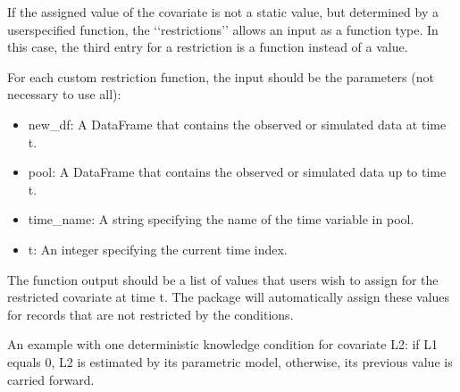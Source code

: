 \documentclass[letterpaper,10pt,english]{sphinxmanual}
\begin{document}
\sphinxAtStartPar
If the assigned value of the covariate is not a static value, but determined by a user\sphinxhyphen{}specified function,
the ‘‘restrictions’’ allows an input as a function type. In this case, the third entry for a restriction is a function
instead of a value.

\sphinxAtStartPar
For each custom restriction function, the input should be the parameters (not necessary to use all):
\begin{itemize}
\item {} 
\sphinxAtStartPar
new\_df: A DataFrame that contains the observed or simulated data at time t.

\item {} 
\sphinxAtStartPar
pool: A DataFrame that contains the observed or simulated data up to time t.

\item {} 
\sphinxAtStartPar
time\_name: A string specifying the name of the time variable in pool.

\item {} 
\sphinxAtStartPar
t: An integer specifying the current time index.

\end{itemize}

\sphinxAtStartPar
The function output should be a list of values that users wish to assign for the restricted covariate at time t.
The package will automatically assign these values for records that are not restricted by the conditions.

\sphinxAtStartPar
An example with one deterministic knowledge condition for covariate L2: if L1 equals 0, L2 is estimated
by its parametric model, otherwise, its previous value is carried forward.

\begin{sphinxVerbatim}[commandchars=\\\{\}]
    
      \PYG{p}{[}\PYG{p}{[}\PYG{p}{]}   \PYG{p}{]}
     

  \PYG{p}{[}\PYG{p}{[}       \PYG{p}{]}\PYG{p}{]}
      
\end{sphinxVerbatim}
\end{document}
